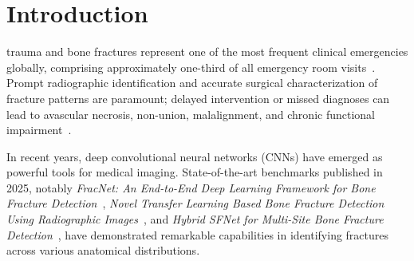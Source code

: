 \documentclass[journal]{IEEEtran}
\begin{document}
\maketitle
\IEEEdisplaynontitleabstractindextext
\IEEEpeerreviewmaketitle

\section{Introduction}
 trauma and bone fractures represent one of the most frequent clinical emergencies globally, comprising approximately one-third of all emergency room visits~\cite{rajpurkar2017mura}. Prompt radiographic identification and accurate surgical characterization of fracture patterns are paramount; delayed intervention or missed diagnoses can lead to avascular necrosis, non-union, malalignment, and chronic functional impairment~\cite{fracatlas2023}. 

In recent years, deep convolutional neural networks (CNNs) have emerged as powerful tools for medical imaging. State-of-the-art benchmarks published in 2025, notably \textit{FracNet: An End-to-End Deep Learning Framework for Bone Fracture Detection}~\cite{fracnet2025}, \textit{Novel Transfer Learning Based Bone Fracture Detection Using Radiographic Images}~\cite{noveltransfer2025}, and \textit{Hybrid SFNet for Multi-Site Bone Fracture Detection}~\cite{sfnet2025}, have demonstrated remarkable capabilities in identifying fractures across various anatomical distributions. 
\end{document}
